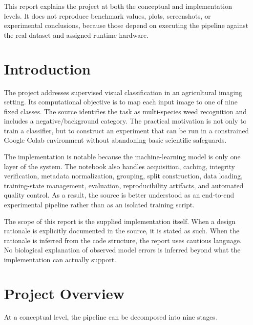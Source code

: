 \documentclass[11pt,a4paper]{article}
\begin{document}
This report explains the project at both the conceptual and implementation levels. It does not reproduce benchmark values, plots, screenshots, or experimental conclusions, because those depend on executing the pipeline against the real dataset and assigned runtime hardware.

\section{Introduction}
The project addresses supervised visual classification in an agricultural imaging setting. Its computational objective is to map each input image to one of nine fixed classes. The source identifies the task as multi-species weed recognition and includes a negative/background category. The practical motivation is not only to train a classifier, but to construct an experiment that can be run in a constrained Google Colab environment without abandoning basic scientific safeguards.

The implementation is notable because the machine-learning model is only one layer of the system. The notebook also handles acquisition, caching, integrity verification, metadata normalization, grouping, split construction, data loading, training-state management, evaluation, reproducibility artifacts, and automated quality control. As a result, the source is better understood as an end-to-end experimental pipeline rather than as an isolated training script.

The scope of this report is the supplied implementation itself. When a design rationale is explicitly documented in the source, it is stated as such. When the rationale is inferred from the code structure, the report uses cautious language. No biological explanation of observed model errors is inferred beyond what the implementation can actually support.

\section{Project Overview}
At a conceptual level, the pipeline can be decomposed into nine stages.
\end{document}
